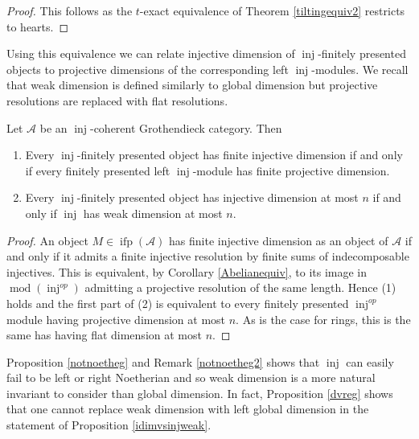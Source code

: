 \documentclass[12pt,oneside]{amsart}
\DeclareMathOperator{\fdmod}{mod}
\DeclareMathOperator{\inj}{inj}
\DeclareMathOperator{\ifp}{ifp}
\begin{document}
\begin{proof}
This follows as the $t$-exact equivalence of Theorem \ref{tiltingequiv2} restricts to hearts. 
\end{proof}

Using this equivalence we can relate injective dimension of $\inj$-finitely presented objects to projective dimensions of the corresponding left $\inj$-modules. We recall that weak dimension is defined similarly to global dimension but projective resolutions are replaced with flat resolutions. 

\begin{prop} \label{idimvsinjweak}
Let $\mathcal{A}$ be an $\inj$-coherent Grothendieck category. Then
\begin{enumerate}
\item Every $\inj$-finitely presented object has finite injective dimension if and only if every finitely presented left $\inj$-module has finite projective dimension.

\item Every $\inj$-finitely presented object has injective dimension at most $n$ if and only if $\inj$ has weak dimension at most $n$.
\end{enumerate}
\end{prop}

\begin{proof}
An object $M \in \ifp(\mathcal{A})$ has finite injective dimension as an object of $\mathcal{A}$ if and only if it admits a finite injective resolution by finite sums of indecomposable injectives. This is equivalent, by Corollary \ref{Abelianequiv}, to its image in $\fdmod(\inj^{op})$ admitting a projective resolution of the same length. Hence (1) holds and the first part of (2) is equivalent to every finitely presented $\inj^{op}$ module having projective dimension at most $n$. As is the case for rings, this is the same has having flat dimension at most $n$. 
\end{proof}


\begin{remark}
Proposition \ref{notnoetheg} and Remark \ref{notnoetheg2} shows that $\inj$ can easily fail to be left or right Noetherian and so weak dimension is a more natural invariant to consider than global dimension. In fact, Proposition \ref{dvreg} shows that one cannot replace weak dimension with left global dimension in the statement of Proposition \ref{idimvsinjweak}.
\end{remark}
\end{document}
